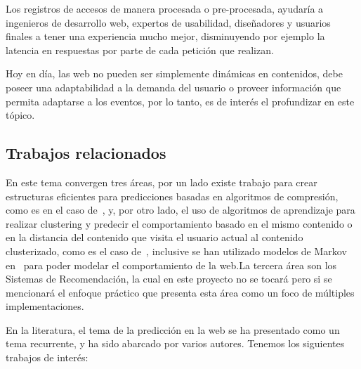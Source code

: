 \documentclass{udparticle}
\begin{document}
  Los registros de accesos de manera procesada o pre-procesada, ayudaría a ingenieros de desarrollo web, expertos de usabilidad, diseñadores y usuarios finales a tener una experiencia mucho mejor, disminuyendo por ejemplo la latencia en respuestas por parte de cada petición que realizan.
  
  Hoy en día, las web no pueden ser simplemente dinámicas en contenidos, debe poseer una adaptabilidad a la demanda del usuario o proveer información que permita adaptarse a los eventos, por lo tanto, es de interés el profundizar en este tópico.


\subsection{Trabajos relacionados}

En este tema convergen tres áreas, por un lado existe trabajo para crear estructuras eficientes para predicciones basadas en algoritmos de compresión, como es en el caso de~\cite{Claude2014}, y, por otro lado, el uso de algoritmos de aprendizaje para realizar clustering y predecir el comportamiento basado en el mismo contenido o en la distancia del contenido que visita el usuario actual al contenido clusterizado, como es el caso de~\cite{Poornalatha2012}, inclusive se han utilizado modelos de Markov en~\cite{Dongshan2002}  para poder modelar el comportamiento de la web.La tercera área son los Sistemas de Recomendación, la cual en este proyecto no se tocará pero si se mencionará el enfoque práctico que presenta  esta área como un foco de múltiples implementaciones. 


En la literatura, el tema de la predicción en la web se ha presentado como un tema recurrente, y ha sido abarcado por varios autores. Tenemos los siguientes trabajos de interés:
\end{document}
